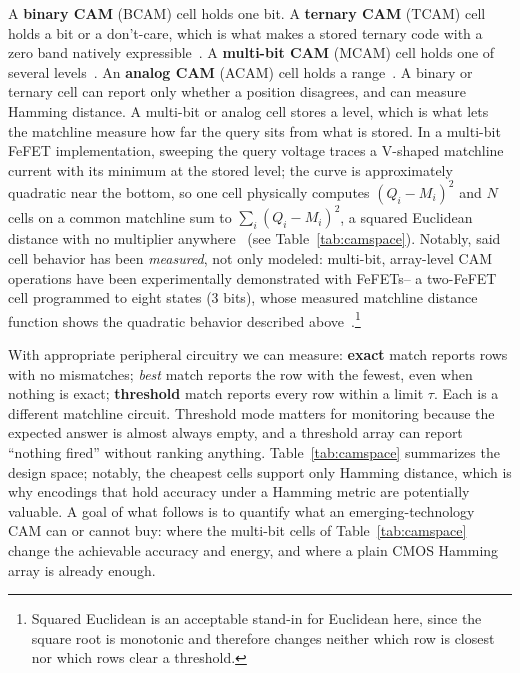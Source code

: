 \documentclass[conference]{IEEEtran}
\newcommand{\cam}{{CAM}\xspace}
\newcommand{\tcam}{{TCAM}\xspace}
\newcommand{\mcam}{{MCAM}\xspace}
\newcommand{\acam}{{ACAM}\xspace}
\newcommand{\fefet}{{FeFET}\xspace}
\newcommand{\fefets}{{FeFETs}\xspace}
\begin{document}
A \textbf{binary \cam} (BCAM) cell holds one bit. A
\textbf{ternary \cam} (\tcam) cell holds a bit or a don't-care, which
is what makes a stored ternary code with a zero band natively
expressible~\cite{ni2019fetcam}. A \textbf{multi-bit \cam} (\mcam) cell
holds one of several levels~\cite{kazemi2021fefetcam}. An
\textbf{analog \cam} (\acam) cell
holds a range~\cite{li2020acam}. A binary or ternary cell can report
only whether a position disagrees, and can measure Hamming
distance. A multi-bit or analog cell stores a level,
which is what lets the matchline measure how far the query sits from
what is stored. In a multi-bit \fefet implementation, sweeping the query
voltage traces a V-shaped matchline current with its minimum at the
stored level; the curve is approximately quadratic near the bottom, so
one cell physically computes $(Q_i-M_i)^2$ and $N$ cells on a common
matchline sum to $\sum_i (Q_i-M_i)^2$, a squared Euclidean distance with
no multiplier anywhere~\cite{kazemi2021fefetcam} (see Table~\ref{tab:camspace}). Notably, said cell
behavior has been \emph{measured}, not only modeled: multi-bit,
array-level \cam operations have been experimentally demonstrated
with \fefets -- a two-\fefet cell programmed to eight states (3
bits), whose measured matchline distance function shows the
quadratic behavior described above~\cite{kazemi2022hdcfefet}.\footnote{Squared
Euclidean is an acceptable stand-in for Euclidean here, since the square
root is monotonic and therefore changes neither which row is closest nor
which rows clear a threshold.}

With appropriate peripheral circuitry we can measure: \textbf{exact}
match reports rows with no mismatches; \emph{best} match reports the
row with the fewest, even when nothing is exact; \textbf{threshold}
match reports
every row within a limit $\tau$. Each is a different matchline circuit.
Threshold mode matters for monitoring because the expected answer is
almost always empty, and a threshold array can report ``nothing fired''
without ranking anything. Table~\ref{tab:camspace} summarizes the
design space; notably, the cheapest cells support only Hamming
distance, which is why encodings that hold accuracy under a Hamming
metric are potentially valuable. A goal of what follows is to
quantify what an emerging-technology \cam can or cannot buy: where
the multi-bit cells of Table~\ref{tab:camspace} change the
achievable accuracy and energy, and where a plain CMOS Hamming
array is already enough.
\end{document}
